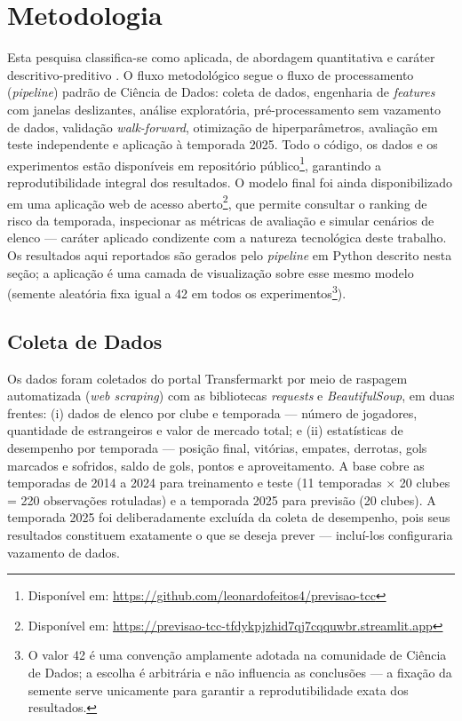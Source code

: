 \documentclass[
    article,
    12pt,
    oneside,
    a4paper,
    english,
    brazilian
    ]{abntex2}
\begin{document}
\section{Metodologia}

Esta pesquisa classifica-se como aplicada, de abordagem quantitativa e caráter descritivo-preditivo \cite{gil2019}. O fluxo metodológico segue o fluxo de processamento (\textit{pipeline}) padrão de Ciência de Dados: coleta de dados, engenharia de \textit{features} com janelas deslizantes, análise exploratória, pré-processamento sem vazamento de dados, validação \textit{walk-forward}, otimização de hiperparâmetros, avaliação em teste independente e aplicação à temporada 2025. Todo o código, os dados e os experimentos estão disponíveis em repositório público\footnote{Disponível em: \url{https://github.com/leonardofeitos4/previsao-tcc}}, garantindo a reprodutibilidade integral dos resultados. O modelo final foi ainda disponibilizado em uma aplicação web de acesso aberto\footnote{Disponível em: \url{https://previsao-tcc-tfdykpjzhid7qj7cqquwbr.streamlit.app}}, que permite consultar o ranking de risco da temporada, inspecionar as métricas de avaliação e simular cenários de elenco --- caráter aplicado condizente com a natureza tecnológica deste trabalho. Os resultados aqui reportados são gerados pelo \textit{pipeline} em Python descrito nesta seção; a aplicação é uma camada de visualização sobre esse mesmo modelo (semente aleatória fixa igual a 42 em todos os experimentos\footnote{O valor 42 é uma convenção amplamente adotada na comunidade de Ciência de Dados; a escolha é arbitrária e não influencia as conclusões --- a fixação da semente serve unicamente para garantir a reprodutibilidade exata dos resultados.}).

\subsection{Coleta de Dados}

Os dados foram coletados do portal Transfermarkt \cite{transfermarkt2025} por meio de raspagem automatizada (\textit{web scraping}) com as bibliotecas \textit{requests} e \textit{BeautifulSoup}, em duas frentes: (i) dados de elenco por clube e temporada --- número de jogadores, quantidade de estrangeiros e valor de mercado total; e (ii) estatísticas de desempenho por temporada --- posição final, vitórias, empates, derrotas, gols marcados e sofridos, saldo de gols, pontos e aproveitamento. A base cobre as temporadas de 2014 a 2024 para treinamento e teste (11 temporadas $\times$ 20 clubes = 220 observações rotuladas) e a temporada 2025 para previsão (20 clubes). A temporada 2025 foi deliberadamente excluída da coleta de desempenho, pois seus resultados constituem exatamente o que se deseja prever --- incluí-los configuraria vazamento de dados.
\end{document}
